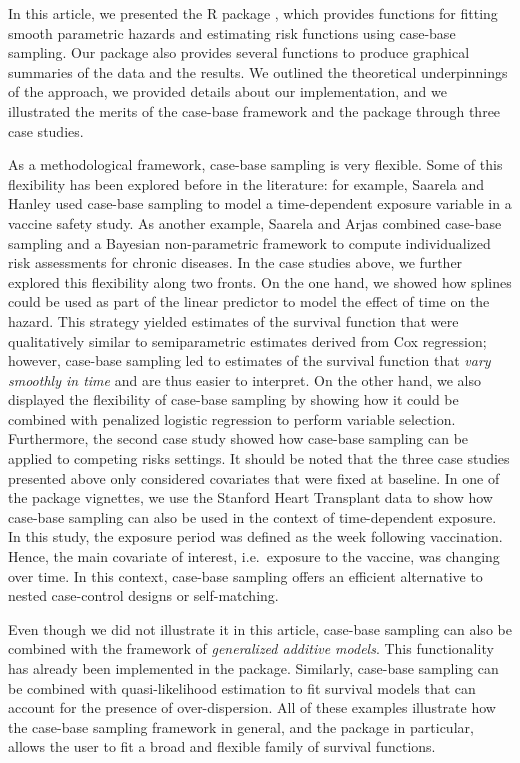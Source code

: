 In this article, we presented the R package , which
provides functions for fitting smooth parametric hazards and estimating
risk functions using case-base sampling. Our package also provides
several functions to produce graphical summaries of the data and the
results. We outlined the theoretical underpinnings of the approach, we
provided details about our implementation, and we illustrated the merits
of the case-base framework and the package through three case studies.

As a methodological framework, case-base sampling is very flexible. Some
of this flexibility has been explored before in the literature: for
example, Saarela and Hanley \citeyearpar{saarela2015case} used case-base
sampling to model a time-dependent exposure variable in a vaccine safety
study. As another example, Saarela and Arjas
\citeyearpar{saarela2015non} combined case-base sampling and a Bayesian
non-parametric framework to compute individualized risk assessments for
chronic diseases. In the case studies above, we further explored this
flexibility along two fronts. On the one hand, we showed how splines
could be used as part of the linear predictor to model the effect of
time on the hazard. This strategy yielded estimates of the survival
function that were qualitatively similar to semiparametric estimates
derived from Cox regression; however, case-base sampling led to
estimates of the survival function that \emph{vary smoothly in time} and
are thus easier to interpret. On the other hand, we also displayed the
flexibility of case-base sampling by showing how it could be combined
with penalized logistic regression to perform variable selection.
Furthermore, the second case study showed how case-base sampling can be
applied to competing risks settings. It should be noted that the three
case studies presented above only considered covariates that were fixed
at baseline. In one of the package vignettes, we use the Stanford Heart
Transplant data \citep[\citet{crowley1977covariance}]{clark1971cardiac}
to show how case-base sampling can also be used in the context of
time-dependent exposure. In this study, the exposure period was defined
as the week following vaccination. Hence, the main covariate of
interest, i.e.~exposure to the vaccine, was changing over time. In this
context, case-base sampling offers an efficient alternative to nested
case-control designs or self-matching.

Even though we did not illustrate it in this article, case-base sampling
can also be combined with the framework of \emph{generalized additive
models}. This functionality has already been implemented in the package.
Similarly, case-base sampling can be combined with quasi-likelihood
estimation to fit survival models that can account for the presence of
over-dispersion. All of these examples illustrate how the case-base
sampling framework in general, and the package  in
particular, allows the user to fit a broad and flexible family of
survival functions.

